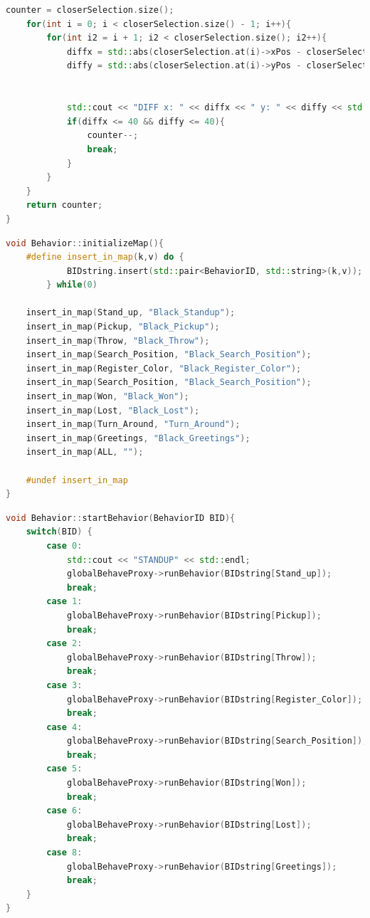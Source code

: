 \begin{appendix}
\begin{lstlisting}[language=c++,
                   caption={Funktion: "`getDiceValue''},
                   label={lst:getDiveValue1}]
        counter = closerSelection.size();
    for(int i = 0; i < closerSelection.size() - 1; i++){
        for(int i2 = i + 1; i2 < closerSelection.size(); i2++){
            diffx = std::abs(closerSelection.at(i)->xPos - closerSelection.at(i2)->xPos);
            diffy = std::abs(closerSelection.at(i)->yPos - closerSelection.at(i2)->yPos);


            std::cout << "DIFF x: " << diffx << " y: " << diffy << std::endl;
            if(diffx <= 40 && diffy <= 40){
                counter--;
                break;
            }
        }
    }
    return counter;
}
\end{lstlisting}

\begin{lstlisting}[language=c++,
                   caption={Behaviour Map},
                   label={lst:behmap}]
void Behavior::initializeMap(){
    #define insert_in_map(k,v) do {                                     \
            BIDstring.insert(std::pair<BehaviorID, std::string>(k,v));  \
        } while(0)

    insert_in_map(Stand_up, "Black_Standup");
    insert_in_map(Pickup, "Black_Pickup");
    insert_in_map(Throw, "Black_Throw");
    insert_in_map(Search_Position, "Black_Search_Position");
    insert_in_map(Register_Color, "Black_Register_Color");
    insert_in_map(Search_Position, "Black_Search_Position");
    insert_in_map(Won, "Black_Won");
    insert_in_map(Lost, "Black_Lost");
    insert_in_map(Turn_Around, "Turn_Around");
    insert_in_map(Greetings, "Black_Greetings");
    insert_in_map(ALL, "");

    #undef insert_in_map
}
\end{lstlisting}

\begin{lstlisting}[language=c++,
                   caption={Behaviour Enumerator},
                   label={lst:behstart}]
void Behavior::startBehavior(BehaviorID BID){
    switch(BID) {
        case 0:
            std::cout << "STANDUP" << std::endl;
            globalBehaveProxy->runBehavior(BIDstring[Stand_up]);
            break;
        case 1:
            globalBehaveProxy->runBehavior(BIDstring[Pickup]);
            break;
        case 2:
            globalBehaveProxy->runBehavior(BIDstring[Throw]);
            break;
        case 3:
            globalBehaveProxy->runBehavior(BIDstring[Register_Color]);
            break;
        case 4:
            globalBehaveProxy->runBehavior(BIDstring[Search_Position]);
            break;
        case 5:
            globalBehaveProxy->runBehavior(BIDstring[Won]);
            break;
        case 6:
            globalBehaveProxy->runBehavior(BIDstring[Lost]);
            break;
        case 8:
            globalBehaveProxy->runBehavior(BIDstring[Greetings]);
            break;
    }
}
\end{lstlisting}


\end{appendix}
